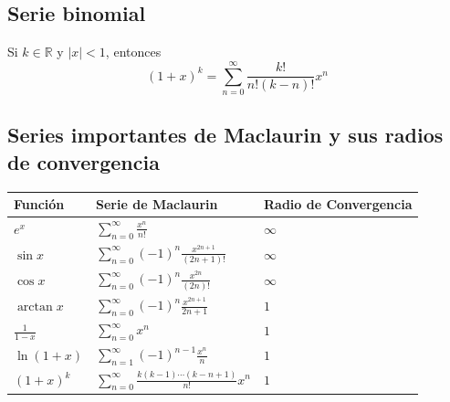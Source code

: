 \documentclass[a4paper,12pt]{article}
\begin{document}
\subsection{Serie binomial}
Si $k \in \mathbb{R}$ y $|x| < 1$, entonces
$$(1+x)^k = \sum_{n=0}^{\infty} \frac{k!}{n!(k-n)!} x^n$$

\subsection{Series importantes de Maclaurin y sus radios de convergencia}
\begin{table}[H]
    \centering
    \begin{tabular}{lll}
        \toprule
        Función & Serie de Maclaurin & Radio de Convergencia \\
        \midrule
        $e^x$ & $\sum_{n=0}^{\infty} \frac{x^n}{n!}$ & $\infty$ \\
        $\sin x$ & $\sum_{n=0}^{\infty} (-1)^n \frac{x^{2n+1}}{(2n+1)!}$ & $\infty$ \\
        $\cos x$ & $\sum_{n=0}^{\infty} (-1)^n \frac{x^{2n}}{(2n)!}$ & $\infty$ \\
        $\arctan x$ & $\sum_{n=0}^{\infty} (-1)^n \frac{x^{2n+1}}{2n+1}$ & $1$ \\
        $\frac{1}{1-x}$ & $\sum_{n=0}^{\infty} x^n$ & $1$ \\
        $\ln(1+x)$ & $\sum_{n=1}^{\infty} (-1)^{n-1} \frac{x^n}{n}$ & $1$ \\
        $(1+x)^k$ & $\sum_{n=0}^{\infty} \frac{k(k-1)\cdots(k-n+1)}{n!} x^n$ & $1$ \\
        \bottomrule
    \end{tabular}
\end{table}

\end{document}
